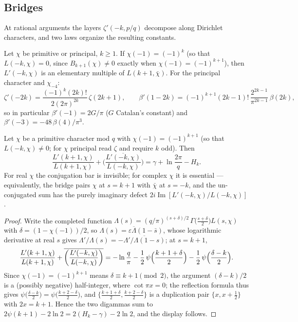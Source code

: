 \subsection{Bridges}\label{stieltjes:sec:negbridges}

At rational arguments the layers $\zeta'(-k,p/q)$ decompose along
Dirichlet characters, and two laws organize the resulting constants.

\begin{proposition}\label{stieltjes:prop:tzbridge}
Let $\chi$ be primitive or principal, $k\ge1$.
If $\chi(-1)=(-1)^{k}$ (so that $L(-k,\chi)=0$, since
$B_{k+1}(\chi)\ne0$ exactly when $\chi(-1)=(-1)^{k+1}$), then $L'(-k,\chi)$
is an elementary multiple of $L(k+1,\bar\chi)$. For the principal character and
$\chi_{-4}$:
\[
\zeta'(-2k)=\frac{(-1)^k(2k)!}{2(2\pi)^{2k}}\,\zeta(2k+1),
\qquad
\beta'(1-2k)=(-1)^{k+1}(2k-1)!\,\frac{2^{2k-1}}{\pi^{2k-1}}\,\beta(2k),
\]
so in particular $\beta'(-1)=2G/\pi$ ($G$ Catalan's constant) and
$\beta'(-3)=-48\,\beta(4)/\pi^3$.
\end{proposition}

\begin{theorem}\label{stieltjes:thm:hbridge}
Let $\chi$ be a primitive character mod $q$ with $\chi(-1)=(-1)^{k+1}$ (so
that $L(-k,\chi)\ne0$; for $\chi$ principal read $\zeta$ and require $k$
odd). Then
\[
\frac{L'(k+1,\chi)}{L(k+1,\chi)}
+\overline{\biggl(\frac{L'(-k,\chi)}{L(-k,\chi)}\biggr)}
=\gamma+\ln\frac{2\pi}{q}-H_k .
\]
For real $\chi$ the conjugation bar is invisible; for complex $\chi$ it is
essential — equivalently, the bridge pairs $\chi$ at $s=k+1$ with
$\bar\chi$ at $s=-k$, and the un-conjugated sum has the purely imaginary
defect $2i\operatorname{Im}[L'(-k,\chi)/L(-k,\chi)]$.
\end{theorem}

\begin{proof}
Write the completed function
$\Lambda(s)=(q/\pi)^{(s+\delta)/2}\,\Gamma\bigl(\tfrac{s+\delta}{2}\bigr)
L(s,\chi)$ with $\delta=(1-\chi(-1))/2$, so
$\Lambda(s)=\varepsilon\overline{\Lambda}(1-\bar s)$, whose logarithmic
derivative at real $s$ gives
$\Lambda'/\Lambda(s)=-\overline{\Lambda'/\Lambda(1-s)}$; at $s=k+1$,
\[
\frac{L'(k+1,\chi)}{L(k+1,\chi)}
+\overline{\biggl(\frac{L'(-k,\chi)}{L(-k,\chi)}\biggr)}
=-\ln\frac q\pi-\frac12\,
\psi\Bigl(\frac{k+1+\delta}2\Bigr)-\frac12\,\psi\Bigl(\frac{\delta-k}2\Bigr).
\]
Since $\chi(-1)=(-1)^{k+1}$ means $\delta\equiv k+1\pmod 2$, the argument
$(\delta-k)/2$ is a (possibly negative) half-integer, where
$\cot\pi x=0$; the reflection formula thus gives
$\psi\bigl(\tfrac{\delta-k}2\bigr)=\psi\bigl(\tfrac{k+2-\delta}2\bigr)$,
and $\bigl\{\tfrac{k+1+\delta}2,\tfrac{k+2-\delta}2\bigr\}$ is a
duplication pair $\{x,x+\tfrac12\}$ with $2x=k+1$. Hence the two digammas
sum to $2\psi(k+1)-2\ln2=2(H_k-\gamma)-2\ln2$, and the display follows.
\end{proof}

